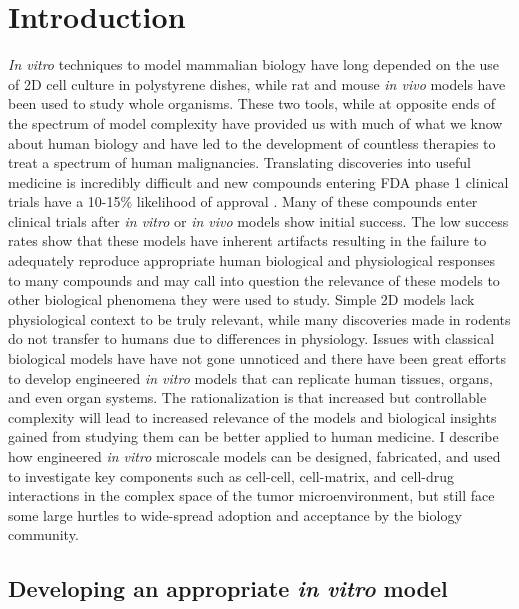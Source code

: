 \chapter{Introduction}
\label{Chap:Introduction}

\textit{In vitro} techniques to model mammalian biology have long depended on the use of 2D cell culture in polystyrene dishes, while rat and mouse \textit{in vivo} models have been used to study whole organisms. These two tools, while at opposite ends of the spectrum of model complexity have provided us with much of what we know about human biology and have led to the development of countless therapies to treat a spectrum of human malignancies. Translating discoveries into useful medicine is incredibly difficult and new compounds entering FDA phase 1 clinical trials have a 10-15\% likelihood of approval \cite{Hay2014}. Many of these compounds enter clinical trials after \textit{in vitro} or \textit{in vivo} models show initial success. The low success rates show that these models have inherent artifacts resulting in the failure to adequately reproduce appropriate human biological and physiological responses to many compounds and may call into question the relevance of these models to other biological phenomena they were used to study. Simple 2D models lack physiological context to be truly relevant, while many discoveries made in rodents do not transfer to humans due to differences in physiology. Issues with classical biological models have have not gone unnoticed and there have been great efforts to develop engineered \textit{in vitro} models that can replicate human tissues, organs, and even organ systems. The rationalization is that increased but controllable complexity will lead to increased relevance of the models and biological insights gained from studying them can be better applied to human medicine. I describe how engineered \textit{in vitro} microscale models can be designed, fabricated, and used to investigate key components such as cell-cell, cell-matrix, and cell-drug interactions in the complex space of the tumor microenvironment, but still face some large hurtles to wide-spread adoption and acceptance by the biology community.

\section{Developing an appropriate \textit{in vitro} model}

